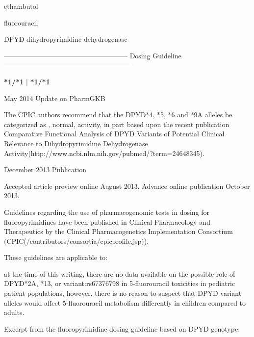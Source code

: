 \documentclass{resume} %
\begin{document}
\begin{rSection}{ ethambutol }
\end{rSection}\begin{rSection}{ fluorouracil }
\item[]
\begin{rSubsection}{ DPYD }{ dihydropyrimidine dehydrogenase }{}{}
\item[]
\item[] ------------------------------------------------------ Dosing Guideline --------------------------------------------------------\newline
\item[]
\item[] \textbf{ *1/*1 } | \textbf{ *1/*1 }
\item May 2014 Update on PharmGKB
 \newline
\item The CPIC authors recommend that the DPYD*4, *5, *6 and *9A alleles be categorized as , normal,  activity, in part based upon the recent publication Comparative Functional Analysis of DPYD Variants of Potential Clinical Relevance to Dihydropyrimidine Dehydrogenase Activity(http://www.ncbi.nlm.nih.gov/pubmed/?term=24648345). 
 \newline
\item December 2013 Publication
 \newline
\item Accepted article preview online August 2013,  Advance online publication October 2013.
 \newline
\item Guidelines regarding the use of pharmacogenomic tests in dosing for fluoropyrimidines have been published in Clinical Pharmacology and Therapeutics by the Clinical Pharmacogenetics Implementation Consortium (CPIC(/contributors/consortia/cpicprofile.jsp)).
 \newline
\item These guidelines are applicable to:
 \newline
\item at the time of this writing, there are no data available on the possible role of DPYD*2A, *13, or variant:rs67376798 in 5-fluorouracil toxicities in pediatric patient populations,  however, there is no reason to suspect that DPYD variant alleles would affect 5-fluorouracil metabolism differently in children compared to adults.
 \newline
\item Excerpt from the fluoropyrimidine dosing guideline based on DPYD genotype:
 \newline

\end{rSubsection}
\end{rSection}
\end{document}
